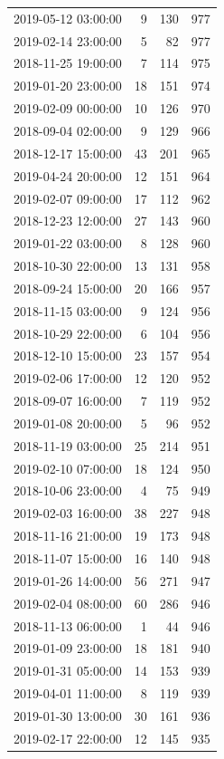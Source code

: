 \begin{tabular}{lrrr}
2019-05-12 03:00:00 & 9 & 130 & 977 \\
2019-02-14 23:00:00 & 5 & 82 & 977 \\
2018-11-25 19:00:00 & 7 & 114 & 975 \\
2019-01-20 23:00:00 & 18 & 151 & 974 \\
2019-02-09 00:00:00 & 10 & 126 & 970 \\
2018-09-04 02:00:00 & 9 & 129 & 966 \\
2018-12-17 15:00:00 & 43 & 201 & 965 \\
2019-04-24 20:00:00 & 12 & 151 & 964 \\
2019-02-07 09:00:00 & 17 & 112 & 962 \\
2018-12-23 12:00:00 & 27 & 143 & 960 \\
2019-01-22 03:00:00 & 8 & 128 & 960 \\
2018-10-30 22:00:00 & 13 & 131 & 958 \\
2018-09-24 15:00:00 & 20 & 166 & 957 \\
2018-11-15 03:00:00 & 9 & 124 & 956 \\
2018-10-29 22:00:00 & 6 & 104 & 956 \\
2018-12-10 15:00:00 & 23 & 157 & 954 \\
2019-02-06 17:00:00 & 12 & 120 & 952 \\
2018-09-07 16:00:00 & 7 & 119 & 952 \\
2019-01-08 20:00:00 & 5 & 96 & 952 \\
2018-11-19 03:00:00 & 25 & 214 & 951 \\
2019-02-10 07:00:00 & 18 & 124 & 950 \\
2018-10-06 23:00:00 & 4 & 75 & 949 \\
2019-02-03 16:00:00 & 38 & 227 & 948 \\
2018-11-16 21:00:00 & 19 & 173 & 948 \\
2018-11-07 15:00:00 & 16 & 140 & 948 \\
2019-01-26 14:00:00 & 56 & 271 & 947 \\
2019-02-04 08:00:00 & 60 & 286 & 946 \\
2018-11-13 06:00:00 & 1 & 44 & 946 \\
2019-01-09 23:00:00 & 18 & 181 & 940 \\
2019-01-31 05:00:00 & 14 & 153 & 939 \\
2019-04-01 11:00:00 & 8 & 119 & 939 \\
2019-01-30 13:00:00 & 30 & 161 & 936 \\
2019-02-17 22:00:00 & 12 & 145 & 935 \\

\end{tabular}
